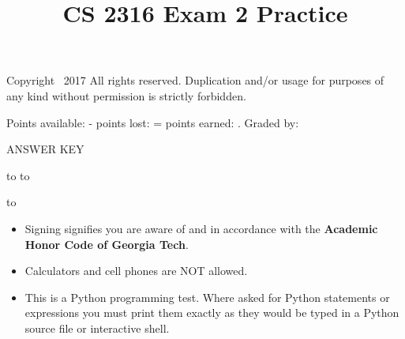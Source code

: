 \documentclass[addpoints,9pt]{exam}
\title{CS 2316 Exam 2 Practice}
\date{}
\begin{document}
\maketitle
\thispagestyle{head}


\runningheader{}
              {\tiny Copyright \textcopyright\ 2017 All rights reserved. Duplication and/or usage for purposes of any kind without permission is strictly forbidden.}
              {}

              {}
              {Points available: \pointsonpage{\thepage} -
               points lost: \makebox[.5in]{\hrulefill} =
               points earned:  \makebox[.5in]{\hrulefill}.
              Graded by: \makebox[.5in]{\hrulefill}}


\ifprintanswers
\begin{center}
{\LARGE ANSWER KEY}
\end{center}
\else
\vspace{0.1in}
\hbox to \textwidth{Name (print clearly): \enspace\hrulefill}
\vspace{0.3in}
\hbox to \textwidth{Signature: \hrulefill}

\vspace{0.3in}
\hbox to \textwidth{GT account username (gtg, gth, msmith3, etc): \enspace\hrulefill}

\fi

\vfill

\begin{itemize}
\item Signing signifies you are aware of and in accordance with the {\bf Academic Honor Code of Georgia Tech}.
\item Calculators and cell phones are NOT allowed.
\item This is a Python programming test.  Where asked for Python statements or expressions you must print them exactly as they would be typed in a Python source file or interactive shell.
\end{itemize}

\vfill

\addpoints
\end{document}
